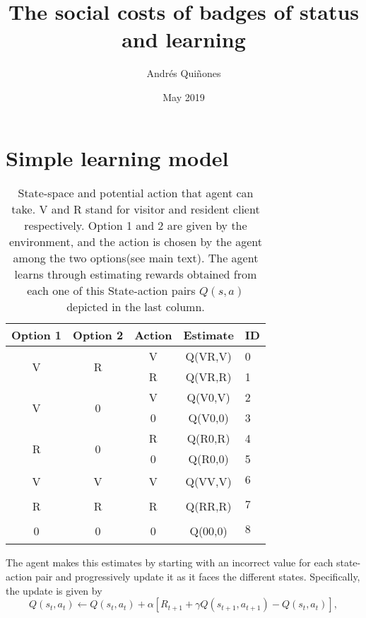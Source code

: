 \documentclass{article}
\begin{document}
\title{The social costs of badges of status and learning} \author{Andr\'es Qui\~nones} \date{May 2019}
\maketitle

\section{Simple learning model}
\label{simple_model}


\begin{table}
	\centering
\begin{tabular}{c|c|c|cl}
	Option 1 & Option 2 & Action & Estimate & ID \\ \hline
	\multirow{2}{*}{V} & \multirow{2}{*}{R}  & V & Q(VR,V) & 0 \\ \cline{3-4} & & R & Q(VR,R) & 1\\ \cline{3-4} \hline
	\multirow{2}{*}{V} & \multirow{2}{*}{0}  & V & Q(V0,V) & 2 \\ \cline{3-4} & & 0 & Q(V0,0) & 3\\ \cline{3-4} \hline
	\multirow{2}{*}{R} & \multirow{2}{*}{0}  & R & Q(R0,R) & 4\\ \cline{3-4} & & 0 & Q(R0,0) & 5 \\ \cline{3-4} \hline
	\multirow{2}{*}{V} & \multirow{2}{*}{V}  & \multirow{2}{*}{V} & \multirow{2}{*}{Q(VV,V)} & 6 \\ & & \\  \hline
	\multirow{2}{*}{R} & \multirow{2}{*}{R}  & \multirow{2}{*}{R} & \multirow{2}{*}{Q(RR,R)} & 7 \\ & & \\  \hline
	\multirow{2}{*}{0} & \multirow{2}{*}{0}  & \multirow{2}{*}{0} & \multirow{2}{*}{Q(00,0)} & 8 \\ & & 
\end{tabular}
	\label{table:States}
	\caption{ State-space and potential action that agent can take. V and R stand for visitor and resident client respectively. Option 1 and 2 are given by the environment, and the action is chosen by the agent among the two options(see main text). The agent learns through estimating rewards obtained from each one of this State-action pairs $Q(s,a)$ depicted in the last column.}
\end{table}



The agent makes this estimates by starting with an incorrect value for each state-action pair and progressively update it as it faces the different states. Specifically, the update is given by
\begin{equation}
	Q(s_t,a_t)\leftarrow Q(s_t,a_t) +\alpha [R_{t+1}+\gamma Q(s_{t+1},a_{t+1})-Q(s_t,a_t)],
	\label{equation:updateRule}
\end{equation}
\end{document}
